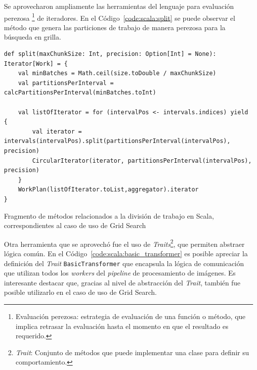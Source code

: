 \documentclass[11pt]{article}
\newcommand{\english}[1]{\textit{#1}}
\begin{document}
Se aprovecharon ampliamente las herramientas del lenguaje para evaluación perezosa \footnote{Evaluación perezosa: estrategia de evaluación de una función o método, que implica retrasar la evaluación hasta el momento en que el resultado es requerido.} de iteradores. En el Código~\ref{code:scala:split} se puede observar el método que genera las particiones de trabajo de manera perezosa para la búsqueda en grilla.

\begin{listing}[ht]
\begin{verbatim}
def split(maxChunkSize: Int, precision: Option[Int] = None): Iterator[Work] = {
    val minBatches = Math.ceil(size.toDouble / maxChunkSize)
    val partitionsPerInterval = calcPartitionsPerInterval(minBatches.toInt)

    val listOfIterator = for (intervalPos <- intervals.indices) yield {
        val iterator = intervals(intervalPos).split(partitionsPerInterval(intervalPos), precision)
        CircularIterator(iterator, partitionsPerInterval(intervalPos), precision)
    }
    WorkPlan(listOfIterator.toList,aggregator).iterator
}
\end{verbatim}
\caption{Fragmento de métodos relacionados a la división de trabajo en Scala, correspondientes al caso de uso de Grid Search}
\label{code:scala:split}
\end{listing}

Otra herramienta que se aprovechó fue el uso de \english{Traits}\footnote{\english{Trait}: Conjunto de métodos que puede implementar una clase para definir su comportamiento.}, que permiten abstraer lógica común. En el Código~\ref{code:scala:basic_transformer} es posible apreciar la definición del \english{Trait} \lstinline{BasicTransformer} que encapsula la lógica de comunicación que utilizan todos los \english{workers} del \english{pipeline} de procesamiento de imágenes. Es interesante destacar que, gracias al nivel de abstracción del \english{Trait}, también fue posible utilizarlo en el caso de uso de Grid Search.
\end{document}
